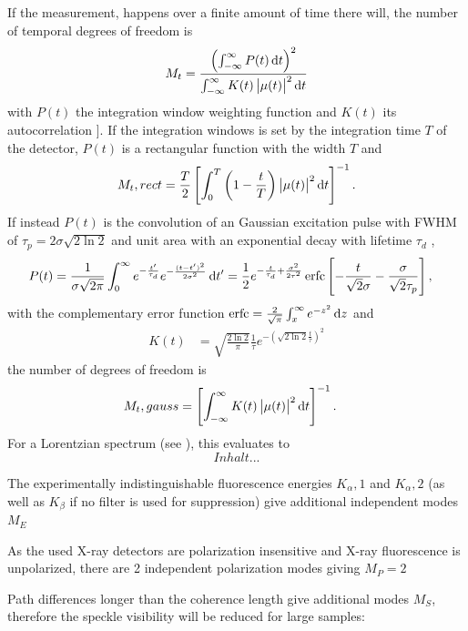 If the measurement, happens over a finite amount of time there will, the number of temporal degrees of freedom is
\begin{equation}
M_t=\frac{\left(\int_{-\infty}^{\infty} P(t)\operatorname{\mathrm{d}\!} t\right)^2}{\int_{-\infty}^{\infty} K(t) \left|\mu(t)\right|^2\operatorname{\mathrm{d}\!} t}
\end{equation}
with $P(t)$ the integration window weighting function and $K(t)$ its autocorrelation \cite{goodman2007}]. If the integration windows is set by the integration time $T$ of the detector, $P(t)$ is a rectangular function with the width $T$ and
\begin{equation}
M_t,rect = \frac{T}{2} \left[\int_{0}^{T} \left( 1-\frac{t}{T}\right) \left|\mu(t)\right|^2 \operatorname{\mathrm{d}\!} t \right]^{-1} .
\end{equation}
If instead $P(t)$ is the convolution of an Gaussian excitation pulse with FWHM of $\tau_p=2\sigma\sqrt{2\ln2}$ and unit area with an exponential decay with lifetime $\tau_d$ \cite{butz2015},
\begin{align}
P(t)&=\frac{1}{\sigma\sqrt{2\pi}} \int_0^{\infty} e^{-\frac{t^{\prime}}{\tau_d}} 
e^{-\frac{(t-t^{\prime})^2}{2\sigma^2}}\operatorname{\mathrm{d}\!} t^{\prime}
=\frac{1}{2}e^{-\frac{t}{\tau_d}+\frac{\sigma^2}{2\tau^2}}
\operatorname{erfc}\left[
-\frac{t}{\sqrt{2}\sigma}
-\frac{\sigma}{\sqrt{2}\tau_p}
	\right] ,
	\end{align}
	with the complementary error function $\operatorname{erfc}=\frac{2}{\sqrt{\pi}}\int_x^\infty e^{-z^2}\operatorname{\mathrm{d}\!} z$
	and
	\begin{align}
K(t)&= \sqrt{\frac{2{\ln 2}}{\pi}}\frac{1}{ \tau} e^{-\left(\sqrt{2\ln 2}\frac{t}{\tau}\right)^2}
\end{align}
the number of degrees of freedom is
\begin{align}
M_t,gauss&=\left[\int_{-\infty}^{\infty} K(t) \left|\mu(t)\right|^2\operatorname{\mathrm{d}\!} t\right]^{-1}.
\end{align}
For a Lorentzian spectrum (see ), this evaluates to
\begin{equation}
	Inhalt...
\end{equation} 

The experimentally indistinguishable fluorescence energies $K_\alpha,1$ and $K_\alpha,2$ (as well as  $K_\beta$ if no filter is used for suppression) give additional independent modes $M_E$

As the used X-ray detectors are polarization insensitive and X-ray fluorescence is unpolarized, there are 2 independent polarization modes giving $M_P = 2$  


Path differences longer than the coherence length give additional modes $M_S$, therefore the speckle visibility will be reduced for large samples:

